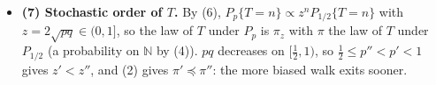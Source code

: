 \documentclass[10pt]{article}
\newcommand{\N}{\mathbb{N}}
\begin{document}
\begin{itemize}[leftmargin=1.5em, itemsep=6pt]
\item \textbf{(7) Stochastic order of $T$.} By (6), $P_p\{T=n\}\propto z^nP_{1/2}\{T=n\}$ with $z=2\sqrt{pq}\in(0,1]$, so the law of $T$ under $P_p$ is $\pi_z$ with $\pi$ the law of $T$ under $P_{1/2}$ (a probability on $\N$ by (4)). $pq$ decreases on $[\tfrac12,1)$, so $\tfrac12\le p''<p'<1$ gives $z'<z''$, and (2) gives $\pi'\preceq\pi''$: the more biased walk exits sooner.
\end{itemize}
\end{document}
